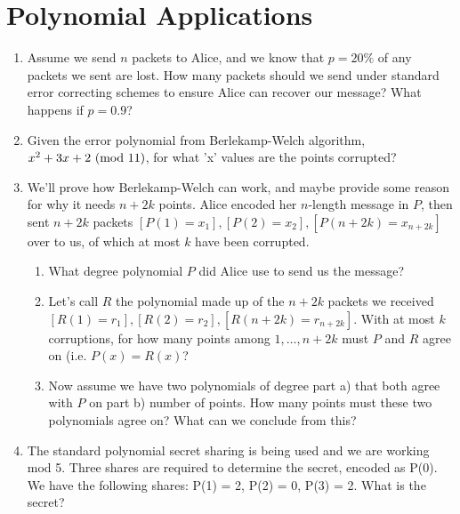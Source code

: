 \documentclass{article}
\begin{document}
    \section{Polynomial Applications}
    \begin{enumerate}
        \item Assume we send $n$ packets to Alice, and we know that $p = 20\%$ of any packets we sent are lost. How many packets should we send under standard error correcting schemes
        to ensure Alice can recover our message? What happens if $p=0.9$?
        \begin{solution}
        \end{solution}
        \item Given the error polynomial from Berlekamp-Welch algorithm, $x^2 + 3x + 2 \textnormal{ (mod } 11)$, for what ’x’ values are the points corrupted?
        \begin{solution}
        \end{solution}
        \item We'll prove how Berlekamp-Welch can work, and maybe provide some reason for why it needs $n+2k$ points. Alice encoded her $n$-length message in $P$, then sent
        $n+2k$ packets $[P(1) = x_1], [P(2) = x_2], [P(n+2k)=x_{n+2k}]$ over to us, of which at most $k$ have been corrupted.
        \begin{enumerate}
            \item What degree polynomial $P$ did Alice use to send us the message?
            \begin{solution}
            \end{solution}
            \item Let's call $R$ the polynomial made up of the $n+2k$ packets we received $[R(1) = r_1], [R(2) = r_2], [R(n+2k)=r_{n+2k}]$.
            With at most $k$ corruptions, for how many points among $1, \ldots, n+2k$ must $P$ and $R$ agree on (i.e. $P(x) = R(x)$?
            \begin{solution}
            \end{solution}
            \item Now assume we have two polynomials of degree part a) that both agree with $P$ on part b) number of points. How many points must these
            two polynomials agree on? What can we conclude from this?
            \begin{solution}
            \end{solution}
        \end{enumerate}
        \item The standard polynomial secret sharing is being used and we are working mod 5. Three shares are required to determine the secret, encoded as P(0). We have the following shares: P(1) = 2, P(2) = 0, P(3) = 2. What is the secret?

\end{enumerate}
\end{document}
